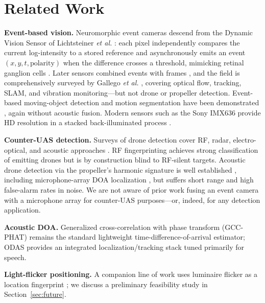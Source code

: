 \documentclass[conference]{IEEEtran}
\begin{document}
\section{Related Work}
\textbf{Event-based vision.} Neuromorphic event cameras descend from the
Dynamic Vision Sensor of Lichtsteiner \emph{et al.}
\cite{lichtsteiner2008}: each pixel independently compares the current
log-intensity to a stored reference and asynchronously emits an event
$(x, y, t, \mathrm{polarity})$ when the difference crosses a threshold,
mimicking retinal ganglion cells \cite{posch2014}. Later sensors combined
events with frames \cite{brandli2014}, and the field is comprehensively
surveyed by Gallego \emph{et al.} \cite{gallego2020}, covering optical
flow, tracking, SLAM, and vibration monitoring---but not drone or
propeller detection. Event-based moving-object detection and motion
segmentation have been demonstrated \cite{mitrokhin2018,stoffregen2019},
again without acoustic fusion. Modern sensors such as the Sony IMX636
provide HD resolution in a stacked back-illuminated process
\cite{finateu2020}.

\textbf{Counter-UAS detection.} Surveys of drone detection cover RF,
radar, electro-optical, and acoustic approaches
\cite{guvenc2018,taha2019}. RF fingerprinting achieves strong
classification of emitting drones \cite{ezuma2020} but is by construction
blind to RF-silent targets. Acoustic drone detection via the propeller's
harmonic signature is well established \cite{mezei2015,bernardini2017},
including microphone-array DOA localization \cite{shi2018}, but suffers
short range and high false-alarm rates in noise. We are not aware of
prior work fusing an event camera with a microphone array for
counter-UAS purposes---or, indeed, for any detection application.

\textbf{Acoustic DOA.} Generalized cross-correlation with phase transform
(GCC-PHAT) \cite{knapp1976} remains the standard lightweight
time-difference-of-arrival estimator; ODAS \cite{grondin2019} provides an
integrated localization/tracking stack tuned primarily for speech.

\textbf{Light-flicker positioning.} A companion line of work uses
luminaire flicker as a location fingerprint \cite{zhang2016litell,
zhu2017ilamp, wang2020vlp}; we discuss a preliminary feasibility study in
Section~\ref{sec:future}.
\end{document}
